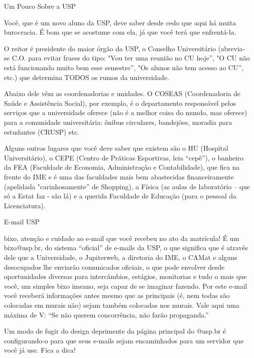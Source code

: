 \begin{secao}{Um Pouco Sobre a USP}

Você, que é um novo aluno da USP, deve saber desde cedo que aqui há muita
burocracia. É bom que se acostume com ela, já que você terá que enfrentá-la. 

O reitor é presidente do maior órgão da USP, o Conselho Universitário (abrevia-se
C.O. para evitar frases do tipo: "Vou ter uma reunião no CU hoje”, "O CU não
está funcionando muito bem esse semestre”, "Os alunos não tem acesso ao CU”,
etc.) que determina TODOS os rumos da universidade.

Abaixo dele vêm as coordenadorias e unidades. O COSEAS (Coordenadoria de Saúde
e Assistência Social), por exemplo, é o departamento responsável pelos serviços
que a universidade oferece (não é a melhor coisa do mundo, mas oferece) para a
comunidade universitária: ônibus circulares, bandejões, moradia para estudantes
(CRUSP) etc.

Alguns outros lugares que você deve saber que existem são o HU (Hospital
Universitário), o CEPE (Centro de Práticas Esportivas, leia “cepê”), o banheiro
da FEA (Faculdade de Economia, Administração e Contabilidade), que fica na
frente do IME e é uma das faculdades mais bem abastecidas financeiramente
(apelidada "carinhosamente” de Shopping), a Física (as aulas de laboratório –
que só a Estat faz - são lá) e a querida Faculdade de Educação (para o pessoal
da Licenciatura).

\begin{subsecao}{E-mail USP}

bixo, atenção e cuidado ao e-mail que você recebeu no ato da matrícula! É um
bixo@usp.br, do sistema “oficial” de e-mails da USP, o que significa que é
através dele que a Universidade, o Jupiterweb, a diretoria do IME, o CAMat e
alguns desocupados lhe enviarão comunicados oficiais, o que pode envolver desde
oportunidades diversas para intercâmbios, estágios, monitorias e tudo o mais que
você, um simples bixo imeano, seja capaz de se imaginar fazendo. Por este e-mail
você receberá informações antes mesmo que as principais (é, nem todas são
colocadas em murais não) sejam também colocadas nos murais. Vale aqui uma máxima
de V: “Se não querem concorrência, não farão propaganda.” 

Um modo de fugir do design deprimente da página principal do @usp.br é
configurando-o para que seus e-mails sejam encaminhados para um servidor que
você já use. Fica a dica! 

\end{subsecao}


\end{secao}
